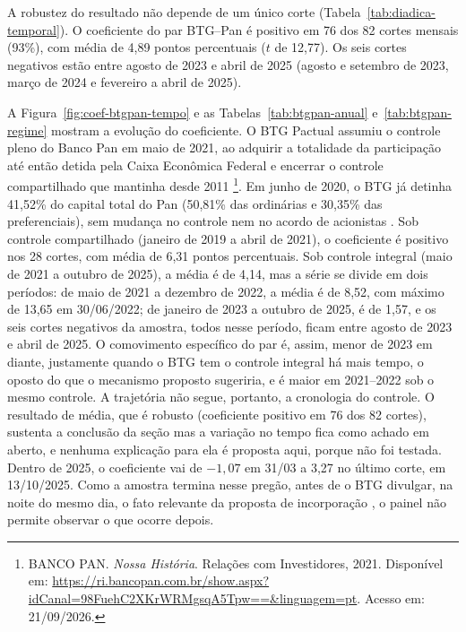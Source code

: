 A robustez do resultado não depende de um único corte (Tabela~\ref{tab:diadica-temporal}).
O coeficiente do par BTG--Pan é positivo em 76 dos 82 cortes mensais (93\%), com
média de 4,89 pontos percentuais ($t$ de 12,77). Os seis
cortes negativos estão entre agosto de 2023 e abril de 2025 (agosto e setembro de
2023, março de 2024 e fevereiro a abril de 2025).

A Figura~\ref{fig:coef-btgpan-tempo} e as Tabelas~\ref{tab:btgpan-anual} e~\ref{tab:btgpan-regime}
mostram a evolução do coeficiente. O BTG Pactual assumiu o controle pleno do Banco Pan em maio de
2021, ao adquirir a totalidade da participação até então detida pela Caixa Econômica Federal e
encerrar o controle compartilhado que mantinha desde 2011
\footnote{BANCO PAN. \textit{Nossa História}. Relações com Investidores,
2021. Disponível em:
\url{https://ri.bancopan.com.br/show.aspx?idCanal=98FuehC2XKrWRMgsqA5Tpw==&linguagem=pt}.
Acesso em: 21/09/2026.}.
Em junho de 2020, o BTG já detinha 41,52\% do capital total do Pan (50,81\% das ordinárias e 30,35\%
das preferenciais), sem mudança no controle nem no acordo de acionistas \parencite{pan2020comunicado}.
Sob controle compartilhado (janeiro de 2019 a abril de 2021), o coeficiente é positivo nos 28
cortes, com média de 6,31 pontos percentuais. Sob controle integral (maio de 2021 a outubro de
2025), a média é de 4,14, mas a série se divide em dois períodos: de maio de 2021 a dezembro de
2022, a média é de 8,52, com máximo de 13,65 em 30/06/2022; de janeiro de 2023 a outubro de 2025,
é de 1,57, e os seis cortes negativos da amostra, todos nesse período, ficam entre agosto de 2023
e abril de 2025. O comovimento específico do par é, assim, menor de 2023 em diante, justamente
quando o BTG tem o controle integral há mais tempo, o oposto do que o mecanismo proposto sugeriria,
e é maior em 2021--2022 sob o mesmo controle. A trajetória não segue, portanto, a cronologia do
controle. O resultado de média, que é robusto (coeficiente positivo em 76 dos 82 cortes), sustenta
a conclusão da seção mas a variação no tempo fica como achado em aberto, e nenhuma explicação para
ela é proposta aqui, porque não foi testada. Dentro de 2025, o coeficiente vai de $-1{,}07$ em 31/03
a 3,27 no último corte, em 13/10/2025. Como a amostra termina nesse pregão, antes de o BTG divulgar,
na noite do mesmo dia, o fato relevante da proposta de incorporação \parencite{btg2025}, o painel
não permite observar o que ocorre depois.

